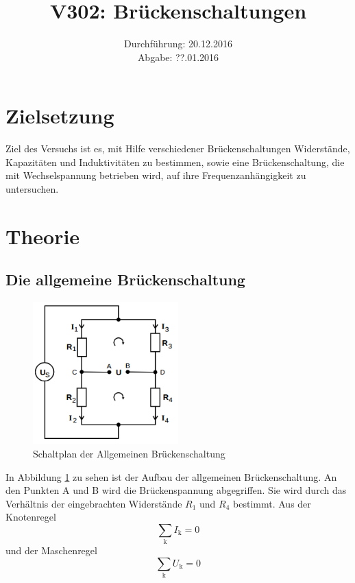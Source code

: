 \documentclass[
  bibliography=totoc,     %
  captions=tableheading,  %
  titlepage=firstiscover, %
]{scrartcl}
\title{V302: Brückenschaltungen}
\author{
  Simon Schulte
  \texorpdfstring{
    \\
    \href{mailto:simon.schulte@udo.edu}{simon.schulte@udo.edu}
  }{}
  \texorpdfstring{\and}{, }
  Tim Sedlaczek
  \texorpdfstring{
    \\
    \href{mailto:tim.sedlaczek@udo.edu}{tim.sedlaczek@udo.edu}
  }{}
}
\date{Durchführung: 20.12.2016\\
      Abgabe: ??.01.2016}
\begin{document}
\maketitle
\thispagestyle{empty}
\tableofcontents
\newpage
\section{Zielsetzung}
\label{sec:zielsetzung}
Ziel des Versuchs ist es, mit Hilfe verschiedener Brückenschaltungen Widerstände,
Kapazitäten und Induktivitäten zu bestimmen, sowie eine Brückenschaltung, die
mit Wechselspannung betrieben wird, auf ihre Frequenzanhängigkeit zu untersuchen.
\section{Theorie}
\label{sec:theorie}
\subsection{Die allgemeine Brückenschaltung}
\label{sec:allgemeinebrückenschaltung}
\begin{figure}[htb]
  \centering
  \includegraphics[width=0.5\textwidth]{V3021.png}
  \caption{Schaltplan der Allgemeinen Brückenschaltung}
  \label{fig:V3021}
\end{figure}
In Abbildung \ref{fig:V3021} zu sehen ist der Aufbau der allgemeinen
Brückenschaltung. An den Punkten A und B wird die Brückenspannung abgegriffen.
Sie wird durch das Verhältnis der eingebrachten Widerstände $R_1$ und $R_4$
bestimmt. Aus der Knotenregel
\begin{equation}
  \sum_{\mathup{k}} I_{\mathup{k}}=0
\end{equation}
\label{Knotenregel}
und der Maschenregel
\begin{equation}
  \sum_{\mathup{k}} U_{\mathup{k}}=0
\end{equation}
\label{Maschenregel}
\end{document}
